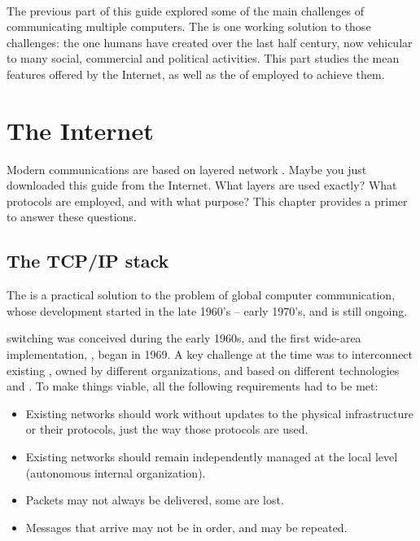 \ \\[-10cm]
The previous part of this guide explored some of the main challenges of communicating multiple computers.
The  is one working solution to those challenges: the one humans have created over the last half century,
now vehicular to many social, commercial and political activities. 
% 
This part studies the mean features offered by the Internet, as well as the  of  
employed to achieve them.



\chapter{The Internet}\label{sec:internet}

Modern communications are based on layered network . 
Maybe you just downloaded this guide from the Internet.
% 
What layers are used exactly? What protocols are employed, and with what purpose?
% 
This chapter provides a primer to answer these questions.\\[-1cm]

\section{The TCP/IP stack}


The  is a practical solution to the problem of global computer communication,
whose development started in the late 1960's -- early 1970's, and is still ongoing.

 switching was conceived during the early 1960s, and the first 
wide-area implementation, , began in 1969. 
% 
A key challenge at the time was to interconnect existing , 
owned by different organizations, and based on different technologies and .
% 
To make things viable, all the following requirements had to be met:
\begin{itemize}
    \item Existing networks should work without updates to the physical infrastructure 
      or their protocols, just the way those protocols are used.
    \item Existing networks should remain independently managed at the local level (autonomous internal organization).
    \item Packets may not always be delivered, some are lost.
    \item Messages that arrive may not be in order, and may be repeated.
\end{itemize}


